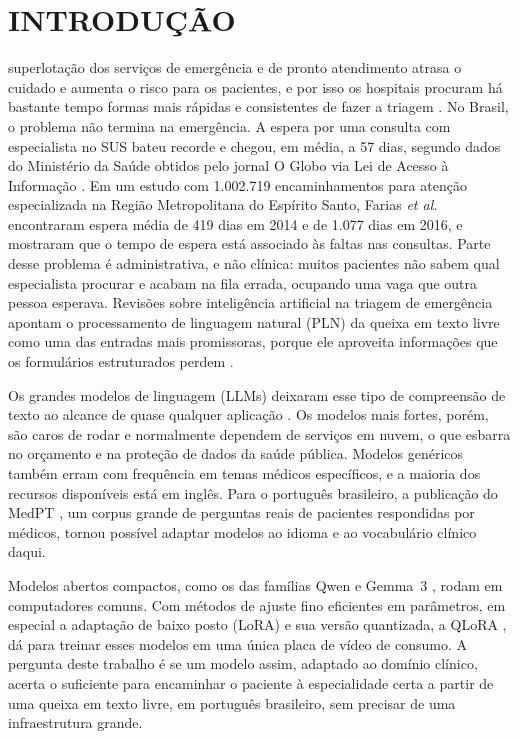 \documentclass{ieeeaccess}
\begin{document}
\section{INTRODU\c{C}\~AO}
\label{sec:introducao}
 superlota\c{c}\~ao dos servi\c{c}os de emerg\^encia e de pronto atendimento atrasa o cuidado e aumenta o risco para os pacientes, e por isso os hospitais procuram h\'a bastante tempo formas mais r\'apidas e consistentes de fazer a triagem \cite{b1,b2}. No Brasil, o problema n\~ao termina na emerg\^encia. A espera por uma consulta com especialista no SUS bateu recorde e chegou, em m\'edia, a 57 dias, segundo dados do Minist\'erio da Sa\'ude obtidos pelo jornal O Globo via Lei de Acesso \`a Informa\c{c}\~ao \cite{b3}. Em um estudo com 1.002.719 encaminhamentos para aten\c{c}\~ao especializada na Regi\~ao Metropolitana do Esp\'irito Santo, Farias \emph{et al.} \cite{b4} encontraram espera m\'edia de 419 dias em 2014 e de 1.077 dias em 2016, e mostraram que o tempo de espera est\'a associado \`as faltas nas consultas. Parte desse problema \'e administrativa, e n\~ao cl\'inica: muitos pacientes n\~ao sabem qual especialista procurar e acabam na fila errada, ocupando uma vaga que outra pessoa esperava. Revis\~oes sobre intelig\^encia artificial na triagem de emerg\^encia apontam o processamento de linguagem natural (PLN) da queixa em texto livre como uma das entradas mais promissoras, porque ele aproveita informa\c{c}\~oes que os formul\'arios estruturados perdem \cite{b1,b5}.

Os grandes modelos de linguagem (LLMs) deixaram esse tipo de compreens\~ao de texto ao alcance de quase qualquer aplica\c{c}\~ao \cite{b6,b7}. Os modelos mais fortes, por\'em, s\~ao caros de rodar e normalmente dependem de servi\c{c}os em nuvem, o que esbarra no or\c{c}amento e na prote\c{c}\~ao de dados da sa\'ude p\'ublica. Modelos gen\'ericos tamb\'em erram com frequ\^encia em temas m\'edicos espec\'ificos, e a maioria dos recursos dispon\'iveis est\'a em ingl\^es. Para o portugu\^es brasileiro, a publica\c{c}\~ao do MedPT \cite{b8}, um corpus grande de perguntas reais de pacientes respondidas por m\'edicos, tornou poss\'ivel adaptar modelos ao idioma e ao vocabul\'ario cl\'inico daqui.

Modelos abertos compactos, como os das fam\'ilias Qwen \cite{b9,b10} e Gemma~3 \cite{b11}, rodam em computadores comuns. Com m\'etodos de ajuste fino eficientes em par\^ametros, em especial a adapta\c{c}\~ao de baixo posto (LoRA) \cite{b12} e sua vers\~ao quantizada, a QLoRA \cite{b13}, d\'a para treinar esses modelos em uma \'unica placa de v\'ideo de consumo. A pergunta deste trabalho \'e se um modelo assim, adaptado ao dom\'inio cl\'inico, acerta o suficiente para encaminhar o paciente \`a especialidade certa a partir de uma queixa em texto livre, em portugu\^es brasileiro, sem precisar de uma infraestrutura grande.
\end{document}
